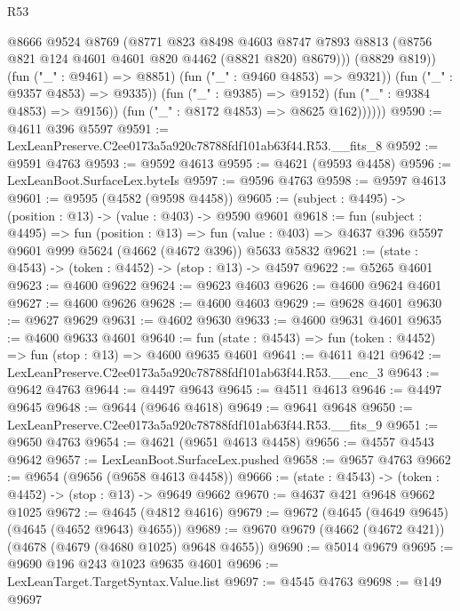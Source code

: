 \begin{lexlean}{R53}
\begin{coremodule}
                        @8666
                        @9524
                        @8769
                        (@8771
                          @823
                          @8498
                          @4603
                          @8747
                          @7893
                          @8813
                          (@8756 @821 @124 @4601 @4601 @820 @4462 (@8821 @820) @8679)))
                      (@8829 @819))
                    (fun ("_" : @9461) => @8851)
                    (fun ("_" : @9460 @4853) => @9321))
                  (fun ("_" : @9357 @4853) => @9335))
                (fun ("_" : @9385) => @9152)
                (fun ("_" : @9384 @4853) => @9156))
              (fun ("_" : @8172 @4853) => @8625 @162))))))
@9590 := @4611 @396 @5597
@9591 := LexLeanPreserve.C2ee0173a5a920c78788fdf101ab63f44.R53.__fits_8
@9592 := @9591 @4763
@9593 := @9592 @4613
@9595 := @4621 (@9593 @4458)
@9596 := LexLeanBoot.SurfaceLex.byteIs
@9597 := @9596 @4763
@9598 := @9597 @4613
@9601 := @9595 (@4582 (@9598 @4458))
@9605 := (subject : @4495) -> (position : @13) -> (value : @403) -> @9590 @9601
@9618 := fun (subject : @4495) =>
  fun (position : @13) =>
  fun (value : @403) => @4637 @396 @5597 @9601 @999 @5624 (@4662 (@4672 @396)) @5633 @5832
@9621 := (state : @4543) -> (token : @4452) -> (stop : @13) -> @4597
@9622 := @5265 @4601
@9623 := @4600 @9622
@9624 := @9623 @4603
@9626 := @4600 @9624 @4601
@9627 := @4600 @9626
@9628 := @4600 @4603
@9629 := @9628 @4601
@9630 := @9627 @9629
@9631 := @4602 @9630
@9633 := @4600 @9631 @4601
@9635 := @4600 @9633 @4601
@9640 := fun (state : @4543) => fun (token : @4452) => fun (stop : @13) => @4600 @9635 @4601
@9641 := @4611 @421
@9642 := LexLeanPreserve.C2ee0173a5a920c78788fdf101ab63f44.R53.__enc_3
@9643 := @9642 @4763
@9644 := @4497 @9643
@9645 := @4511 @4613
@9646 := @4497 @9645
@9648 := @9644 (@9646 @4618)
@9649 := @9641 @9648
@9650 := LexLeanPreserve.C2ee0173a5a920c78788fdf101ab63f44.R53.__fits_9
@9651 := @9650 @4763
@9654 := @4621 (@9651 @4613 @4458)
@9656 := @4557 @4543 @9642
@9657 := LexLeanBoot.SurfaceLex.pushed
@9658 := @9657 @4763
@9662 := @9654 (@9656 (@9658 @4613 @4458))
@9666 := (state : @4543) -> (token : @4452) -> (stop : @13) -> @9649 @9662
@9670 := @4637 @421 @9648 @9662 @1025
@9672 := @4645 (@4812 @4616)
@9679 := @9672 (@4645 (@4649 @9645) (@4645 (@4652 @9643) @4655))
@9689 := @9670 @9679 (@4662 (@4672 @421)) (@4678 (@4679 (@4680 @1025) @9648 @4655))
@9690 := @5014 @9679
@9695 := @9690 @196 @243 @1023 @9635 @4601
@9696 := LexLeanTarget.TargetSyntax.Value.list
@9697 := @4545 @4763
@9698 := @149 @9697

\end{coremodule}
\end{lexlean}

